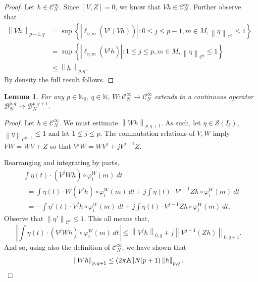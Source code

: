 \documentclass[a4paper,11pt]{amsart}
\newtheorem{lemma}[theorem]{Lemma}
\theoremstyle{remark}
\newcommand{\abs}[1]{\left|#1\right|} %
\newcommand{\cB}{\mathcal{B}} %
\newcommand{\cC}{\mathcal{C}} %
\newcommand{\cS}{\mathcal{S}} %
\newcommand{\bN}{\mathbb{N}} %
\newcommand{\norm}[1]{\left\|#1\right\|} %
\newcommand{\dv}{V} %
\newcommand{\dw}{W} %
\newcommand{\dz}{Z} %
\begin{document}
\begin{proof}
    Let \(h \in \cC^{\infty}_N\).
    Since \([\dv,\dz]=0\), we know that \(\dv h \in \cC^{\infty}_N\).
    Further observe that
    \[
        \begin{aligned}
            \norm{\dv h}_{p-1,q}
             & = \sup
            \left\{
            \abs{\ell_{\eta,m}(\dv^j (\dv h))} :
            0 \leq j\leq p-1, m\in M,  \norm{\eta}_{\cC^{q}}\leq 1
            \right\}                \\
             & = \sup
            \left\{
            \abs{\ell_{\eta,m}(\dv^j  h)} :
            1 \leq j\leq p, m\in M,  \norm{\eta}_{\cC^{q}}\leq 1
            \right\}                \\
             & \leq \norm{h}_{p,q}.
        \end{aligned}
    \]
    By density the full result follows.
\end{proof}

\begin{lemma}
    \label{lem:cont-Y}
    For any \(p \in \bN_0\), \(q \in \bN\),
    \(\dw : \cC^{\infty}_N \rightarrow \cC^{\infty}_N\) extends to a continuous operator \(\cB_{N}^{p,q} \to \cB_{N}^{p,q+1}\).

\end{lemma}

\begin{proof}
    Let $h\in \cC_N^\infty$.
    We must estimate \(\norm{\dw h}_{p,q+1}\).
    As such, let $\eta \in \cS(I_{\delta})$, $\norm{\eta}_{\cC^{q+1}} \leq 1$ and let \(1 \leq j \leq p\).
    The commutation relations of $\dv,\dw$ imply \(\dv \dw = \dw \dv + \dz\) so that \(\dv^j \dw = \dw \dv^j + j \dv^{j-1} \dz\). %

    Rearranging and integrating by parts,
    \begin{align*}
         & \int \eta(t) \cdot (\dv^j\dw h)\circ\varphi_t^\dw(m) \ dt                                                                \\
         & \ \ = \int \eta(t)\cdot  \dw(\dv^j h)\circ\varphi_t^\dw(m)\ dt + j\int \eta(t)\cdot \dv^{j-1}\dz h\circ \varphi_t^\dw(m) \ dt  \\
         & \ \ = - \int \eta'(t) \cdot \dv^j h \circ \varphi_t^\dw(m)\ dt + j\int \eta(t)\cdot \dv^{j-1}\dz h \circ \varphi_t^\dw(m) \ dt.
    \end{align*}
    Observe that \(\norm{\eta'}_{\cC^{q}} \leq 1\).
    This all means that,
    \begin{equation*}
        \left|\int \eta(t) \cdot (\dv^j \dw h)\circ\varphi_t^\dw(m) \ dt\right| \leq \norm{\dv^j h}_{0,q} + j \norm{\dv^{j-1}(\dz h)}_{0,q+1}.
    \end{equation*}
    And so, using also the definition of $\cC_N^\infty$, we have shown that 
    \[
        \norm{\dw h}_{p,q+1} \leq (2\pi K |N|p + 1)\norm{h}_{p,q}. \qedhere
    \]
\end{proof}
\end{document}
